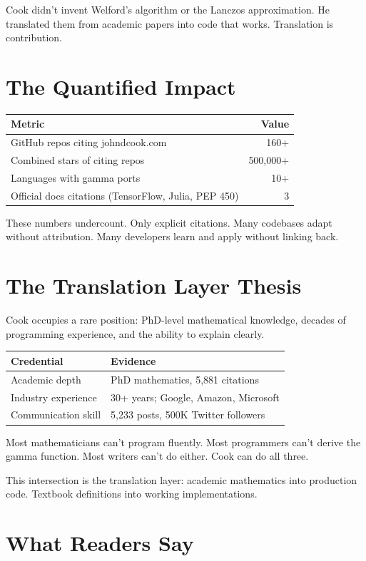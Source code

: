 Cook didn't invent Welford's algorithm or the Lanczos approximation. He translated them from academic papers into code that works. Translation is contribution.

\bigskip

\section*{The Quantified Impact}

\begin{longtable}{l r}
\toprule
\textbf{Metric} & \textbf{Value} \tabularnewline
\midrule
GitHub repos citing johndcook.com & 160+ \tabularnewline
Combined stars of citing repos & 500,000+ \tabularnewline
Languages with gamma ports & 10+ \tabularnewline
Official docs citations (TensorFlow, Julia, PEP 450) & 3 \tabularnewline
\bottomrule
\end{longtable}

These numbers undercount. Only explicit citations. Many codebases adapt without attribution. Many developers learn and apply without linking back.

\bigskip

\section*{The Translation Layer Thesis}

Cook occupies a rare position: PhD-level mathematical knowledge, decades of programming experience, and the ability to explain clearly.

\begin{longtable}{l p{6cm}}
\toprule
\textbf{Credential} & \textbf{Evidence} \tabularnewline
\midrule
Academic depth & PhD mathematics, 5,881 citations \tabularnewline
Industry experience & 30+ years; Google, Amazon, Microsoft \tabularnewline
Communication skill & 5,233 posts, 500K Twitter followers \tabularnewline
\bottomrule
\end{longtable}

Most mathematicians can't program fluently. Most programmers can't derive the gamma function. Most writers can't do either. Cook can do all three.

This intersection is the translation layer: academic mathematics into production code. Textbook definitions into working implementations.

\bigskip

\section*{What Readers Say}

